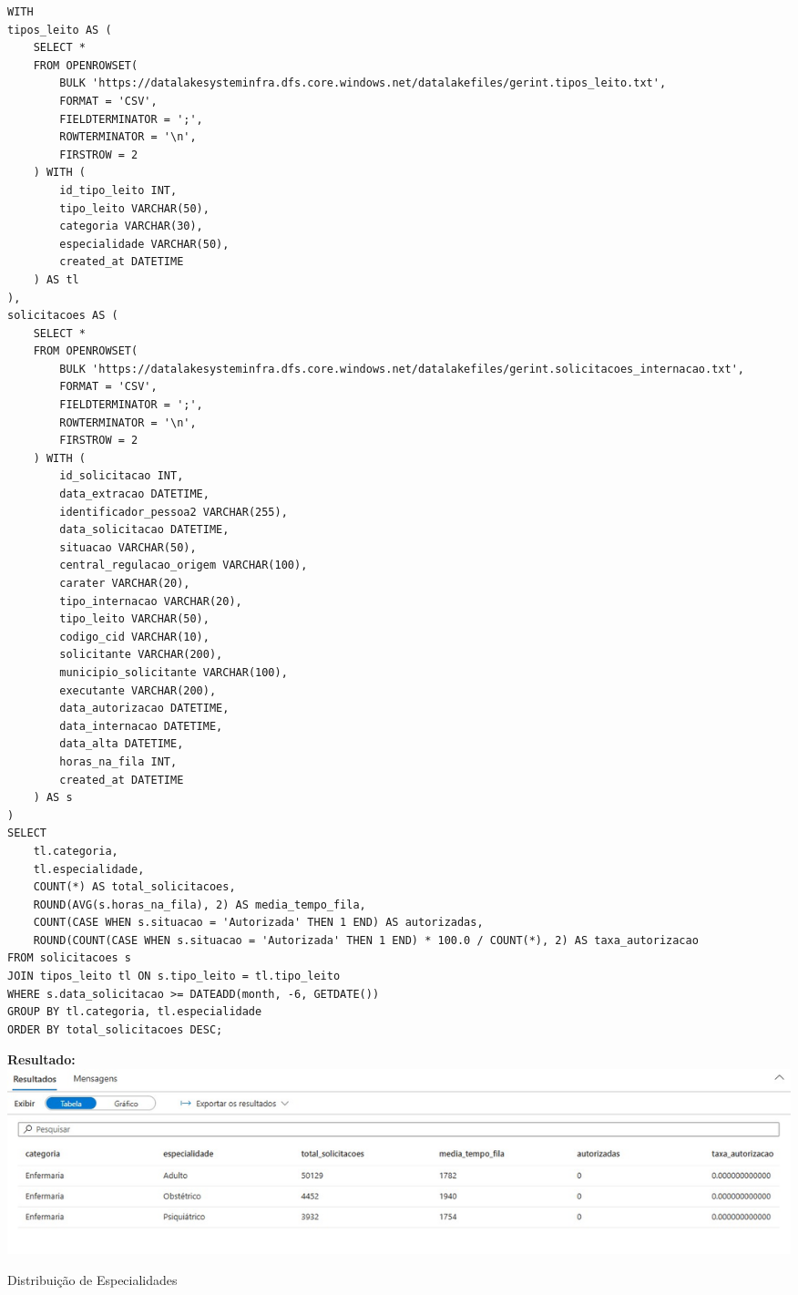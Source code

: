 \documentclass[12pt,a4paper]{article}
\begin{document}
\begin{lstlisting}[style=sqlstyle, caption=Análise Por Especialidade]
WITH 
tipos_leito AS (
    SELECT *
    FROM OPENROWSET(
        BULK 'https://datalakesysteminfra.dfs.core.windows.net/datalakefiles/gerint.tipos_leito.txt',
        FORMAT = 'CSV',
        FIELDTERMINATOR = ';',
        ROWTERMINATOR = '\n',
        FIRSTROW = 2
    ) WITH (
        id_tipo_leito INT,
        tipo_leito VARCHAR(50),
        categoria VARCHAR(30),
        especialidade VARCHAR(50),
        created_at DATETIME
    ) AS tl
),
solicitacoes AS (
    SELECT *
    FROM OPENROWSET(
        BULK 'https://datalakesysteminfra.dfs.core.windows.net/datalakefiles/gerint.solicitacoes_internacao.txt',
        FORMAT = 'CSV',
        FIELDTERMINATOR = ';',
        ROWTERMINATOR = '\n',
        FIRSTROW = 2
    ) WITH (
        id_solicitacao INT,
        data_extracao DATETIME,
        identificador_pessoa2 VARCHAR(255),
        data_solicitacao DATETIME,
        situacao VARCHAR(50),
        central_regulacao_origem VARCHAR(100),
        carater VARCHAR(20),
        tipo_internacao VARCHAR(20),
        tipo_leito VARCHAR(50),
        codigo_cid VARCHAR(10),
        solicitante VARCHAR(200),
        municipio_solicitante VARCHAR(100),
        executante VARCHAR(200),
        data_autorizacao DATETIME,
        data_internacao DATETIME,
        data_alta DATETIME,
        horas_na_fila INT,
        created_at DATETIME
    ) AS s
)
SELECT 
    tl.categoria,
    tl.especialidade,
    COUNT(*) AS total_solicitacoes,
    ROUND(AVG(s.horas_na_fila), 2) AS media_tempo_fila,
    COUNT(CASE WHEN s.situacao = 'Autorizada' THEN 1 END) AS autorizadas,
    ROUND(COUNT(CASE WHEN s.situacao = 'Autorizada' THEN 1 END) * 100.0 / COUNT(*), 2) AS taxa_autorizacao
FROM solicitacoes s
JOIN tipos_leito tl ON s.tipo_leito = tl.tipo_leito
WHERE s.data_solicitacao >= DATEADD(month, -6, GETDATE())
GROUP BY tl.categoria, tl.especialidade
ORDER BY total_solicitacoes DESC;
\end{lstlisting}

\textbf{Resultado:\\}
\includegraphics[width=1.0\textwidth]{comnsulta2_result.jpg}
\caption{Distribuição de Especialidades}
\end{document}
